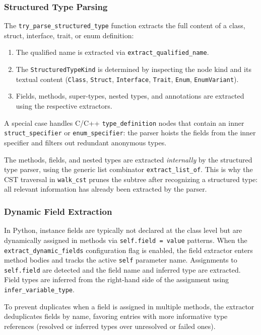 \subsubsection{Structured Type Parsing}

The \texttt{try\_parse\_structured\_type} function extracts the full
content of a class, struct, interface, trait, or enum definition:
\begin{enumerate}
  \item The qualified name is extracted via \texttt{extract\_qualified\_name}.
  \item The \texttt{StructuredTypeKind} is determined by inspecting
    the node kind and its textual content (\texttt{Class},
      \texttt{Struct}, \texttt{Interface}, \texttt{Trait},
    \texttt{Enum}, \texttt{EnumVari}\-\texttt{ant}).
  \item Fields, methods, super-types, nested types, and annotations
    are extracted using the respective extractors.
\end{enumerate}

A special case handles C/C++ \texttt{type\_definition} nodes that
contain an inner \texttt{struct\_specifier} or
\texttt{enum\_specifier}: the parser hoists the fields from the inner
specifier and filters out redundant anonymous types.

The methods, fields, and nested types are extracted
\textit{internally} by the structured type parser, using the generic
list combinator \texttt{extract\_list\_of}. This is why the CST
traversal in \texttt{walk\_cst} prunes the subtree after recognizing
a structured type: all relevant information has already been
extracted by the parser.

\subsubsection{Dynamic Field Extraction}
\label{sec:dynamic_fields}

In Python, instance fields are typically not declared at the class
level but are dynamically assigned in methods via \texttt{self.field
= value} patterns. When the \texttt{extract\_dynamic\_fields}
configuration flag is enabled, the field extractor enters method
bodies and tracks the active \texttt{self} parameter name.
Assignments to \texttt{self.field} are detected and the field name
and inferred type are extracted. Field types are inferred from the
right-hand side of the assignment using \texttt{infer\_variable\_type}.

To prevent duplicates when a field is assigned in multiple methods,
the extractor deduplicates fields by name, favoring entries with more
informative type references (resolved or inferred types over
unresolved or failed ones).

